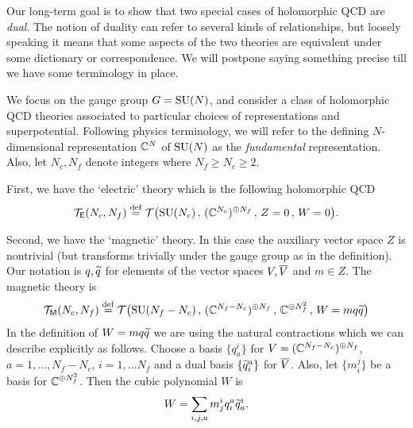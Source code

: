 \documentclass[11pt]{amsart}
\def\SU{{\rm SU}}
\begin{document}
Our long-term goal is to show that two special cases of holomorphic QCD are {\em dual}.
The notion of duality can refer to several kinds of relationships,
but loosely speaking it means that some aspects of the two theories are equivalent under some dictionary or correspondence.
We will postpone saying something precise till we have some terminology in place.

We focus on the gauge group $G = \SU(N)$, and consider a class of holomorphic QCD theories associated to particular choices of representations and superpotential. 
Following physics terminology, we will refer to the defining $N$-dimensional representation $\CC^N$ of $\SU(N)$ as the {\em fundamental} representation. 
Also, let $N_c, N_f$ denote integers where $N_f \geq N_c \geq 2$.

First, we have the `electric' theory which is the following holomorphic QCD
\[
\cT_{\sfE} (N_c , N_f) \define \cT\big(\SU(N_c) \, ,\, (\CC^{N_c})^{\oplus N_f} \, ,\, Z = 0 \, , \, W = 0\big) .
\]


Second, we have the `magnetic' theory. 
In this case the auxiliary vector space $Z$ is nontrivial (but transforms trivially under the gauge group as in the definition). 
Our notation is $q,\Tilde{q}$ for elements of the vector spaces $V, \Bar{V}$ and $m\in Z$.
The magnetic theory is
\[
\cT_{\sfM} (N_c, N_f) \define \cT\big(\SU(N_f - N_c) \, , \, (\CC^{N_f - N_c})^{\oplus N_f} \, , \, \CC^{\oplus N^2_f} \, , \, W = m q \Tilde{q} \big)
\]
In the definition of $W = m q \Tilde{q}$ we are using the natural contractions which we can describe explicitly as follows.
Choose a basis $\{q_a^i\}$ for $V = (\CC^{N_f - N_c})^{\oplus N_f}$, $a = 1,\ldots, N_f - N_c$, $i=1,\ldots N_f$ and a dual basis $\{\Tilde{q}_i^a\}$ for $\Bar{V}$.
Also, let $\{m_i^j\}$ be a basis for $\CC^{\oplus N_f^2}$. 
Then the cubic polynomial $W$ is
\[
W = \sum_{i,j,a} m^i_j q_i^a \Tilde{q}^i_a .
\]
\end{document}
